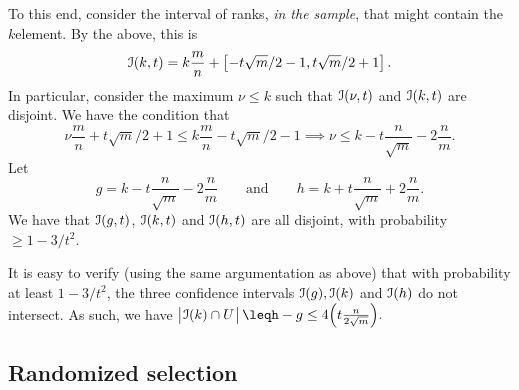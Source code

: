 To this end, consider the interval of ranks, \emph{in the sample},
that might contain the $k$\th element. By the above, this is
\begin{equation*}
  \IntervalA(k, t)%
  =%
  k \frac{m}{n} + \pbrc[]{ -t \sqrt{m}/2 -1, t
  \sqrt{m}/2 +1}.
\end{equation*}
In particular, consider the maximum $\nu\leq k$ such that
$\EuScript{I}(\nu, t)$ and $\EuScript{I}(k, t)$ are disjoint. We have the
condition that
\begin{equation*}
    \nu \frac{m}{n}  +t
    \sqrt{m}/2 +1 \leq k \frac{m}{n} -t\sqrt{m}/2 -1%
    \implies%
    \nu  \leq k  - t \frac{n}{\sqrt{m}} -2\frac{n}{m}.
\end{equation*}
Let
\begin{equation*}
    g= k - t \frac{n}{\sqrt{m}} -2\frac{n}{m}
    \qquad\text{and}\qquad
    h = k + t \frac{n}{\sqrt{m}} +2\frac{n}{m}.
\end{equation*}
We have that $\EuScript{I}(g, t)$, $\EuScript{I}(k, t)$ and
$\EuScript{I}(h, t)$ are all disjoint, with probability $\geq 1 - 3/t^2$.

It is easy to verify (using the same argumentation as above) that with
probability at least $1-3/t^2$, the three confidence intervals
$\EuScript{I}(g), \EuScript{I}(k)$ and $\EuScript{I}(h)$ do not intersect. As
such, we have
\begin{math}
  \cardin{\big.\ts \Interval(k) \cap U\ts}%
  \leq%
  h-g%
  \leq%
  4\pth[]{t \frac{n}{2\sqrt{m}}}.
\end{math}










\subsection{Randomized selection}


